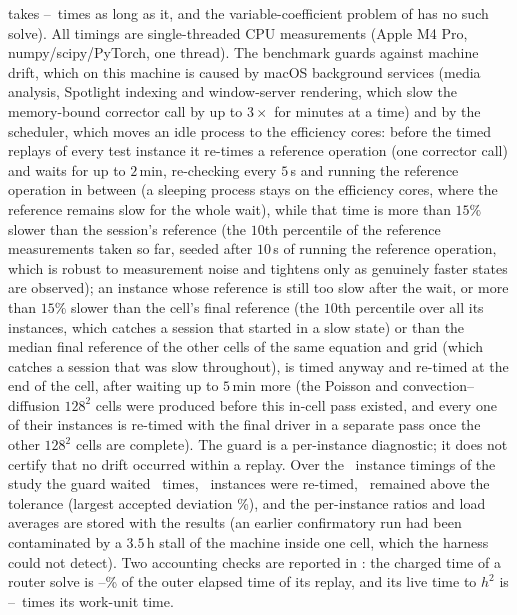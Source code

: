 takes \caFftRatioMin--\caFftRatioMax\ times as long as it, and the variable-coefficient problem of  has no such solve). All timings are single-threaded CPU measurements (Apple M4 Pro, numpy/scipy/PyTorch, one thread). The benchmark guards against machine drift, which on this machine is caused by macOS background services (media analysis, Spotlight indexing and window-server rendering, which slow the memory-bound corrector call by up to $3\times$ for minutes at a time) and by the scheduler, which moves an idle process to the efficiency cores: before the timed replays of every test instance it re-times a reference operation (one corrector call) and waits for up to $2$\,min, re-checking every $5$\,s and running the reference operation in between (a sleeping process stays on the efficiency cores, where the reference remains slow for the whole wait), while that time is more than $15\%$ slower than the session's reference (the $10$th percentile of the reference measurements taken so far, seeded after $10$\,s of running the reference operation, which is robust to measurement noise and tightens only as genuinely faster states are observed); an instance whose reference is still too slow after the wait, or more than $15\%$ slower than the cell's final reference (the $10$th percentile over all its instances, which catches a session that started in a slow state) or than the median final reference of the other cells of the same equation and grid (which catches a session that was slow throughout), is timed anyway and re-timed at the end of the cell, after waiting up to $5$\,min more (the Poisson and convection--diffusion $128^2$ cells were produced before this in-cell pass existed, and every one of their instances is re-timed with the final driver in a separate pass once the other $128^2$ cells are complete). The guard is a per-instance diagnostic; it does not certify that no drift occurred within a replay. Over the \caDriftN\ instance timings of the study the guard waited \caDriftWaits\ times, \caDriftRetimed\ instances were re-timed, \caDriftFlagged\ remained above the tolerance (largest accepted deviation \caDriftMax\%), and the per-instance ratios and load averages are stored with the results (an earlier confirmatory run had been contaminated by a $3.5$\,h stall of the machine inside one cell, which the harness could not detect). Two accounting checks are reported in : the charged time of a router solve is \caChargedFracMin--\caChargedFracMax\% of the outer elapsed time of its replay, and its live time to $h^2$ is \caLiveWuMin--\caLiveWuMax\ times its work-unit time.

